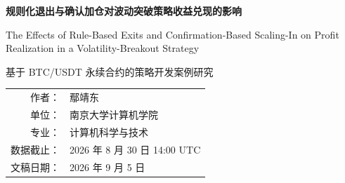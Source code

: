 \documentclass[UTF8,a4paper,12pt,oneside]{ctexart}
\begin{document}
\begin{titlepage}
  \thispagestyle{empty}
  \centering
  \vspace*{2.2cm}
  {\bfseries\color{PaperDark} 规则化退出与确认加仓对波动突破策略收益兑现的影响\par}
  \vspace{0.85cm}
  {\Large\color{PaperNavy} The Effects of Rule-Based Exits and Confirmation-Based Scaling-In on Profit Realization in a Volatility-Breakout Strategy\par}
  \vspace{1.3cm}
  {\large 基于 BTC/USDT 永续合约的策略开发案例研究\par}
  \vspace{1.8cm}
  \begin{tabular}{rl}
    作者： & 鄢靖东 \\
    单位： & 南京大学计算机学院 \\
    专业： & 计算机科学与技术 \\
    数据截止： & 2026 年 8 月 30 日 14:00 UTC \\
    文稿日期： & 2026 年 9 月 5 日
  \end{tabular}
  \vfill
  \vspace{0.8cm}
\end{titlepage}










\clearpage
\printbibliography[title={参考文献}]

\clearpage
\appendix

\end{document}
